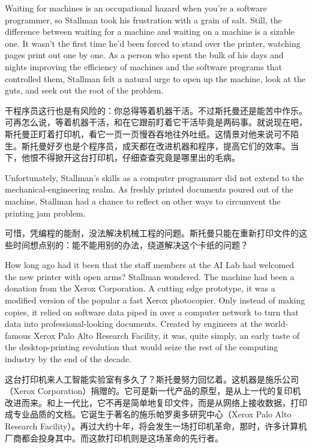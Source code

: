 \ifdefined\eng
Waiting for machines is an occupational hazard when you're a software programmer, so Stallman took his frustration with a grain of salt. Still, the difference between waiting for a machine and waiting on a machine is a sizable one. It wasn't the first time he'd been forced to stand over the printer, watching pages print out one by one. As a person who spent the bulk of his days and nights improving the efficiency of machines and the software programs that controlled them, Stallman felt a natural urge to open up the machine, look at the guts, and seek out the root of the problem.
\fi

\ifdefined\chs
干程序员这行也是有风险的：你总得等着机器干活。不过斯托曼还是能苦中作乐。可再怎么说，等着机器干活，和在它跟前盯着它干活毕竟是两码事。就说现在吧，斯托曼正盯着打印机，看它一页一页慢吞吞地往外吐纸。这情景对他来说可不陌生。斯托曼好歹也是个程序员，成天都在改进机器和程序，提高它们的效率。当下，他恨不得掀开这台打印机，仔细查查究竟是哪里出的毛病。
\fi

\ifdefined\eng
Unfortunately, Stallman's skills as a computer programmer did not extend to the mechanical-engineering realm. As freshly printed documents poured out of the machine, Stallman had a chance to reflect on other ways to circumvent the printing jam problem.
\fi

\ifdefined\chs
可惜，凭编程的能耐，没法解决机械工程的问题。斯托曼只能在重新打印文件的这些时间想点别的：能不能用别的办法，绕道解决这个卡纸的问题？
\fi

\ifdefined\eng
How long ago had it been that the staff members at the AI Lab had welcomed the new printer with open arms? Stallman wondered. The machine had been a donation from the Xerox Corporation. A cutting edge prototype, it was a modified version of 
\ifdefined\vone
the popular
\fi
\ifdefined\vtwo
a fast
\fi
Xerox photocopier. Only instead of making copies, it relied on software data piped in over a computer network to turn that data into professional-looking documents. Created by engineers at the world-famous Xerox Palo Alto Research Facility, it was, quite simply, an early taste of the desktop-printing revolution that would seize the rest of the computing industry by the end of the decade.
\fi

\ifdefined\chs
这台打印机来人工智能实验室有多久了？斯托曼努力回忆着。这机器是施乐公司（Xerox Corporation）捐赠的。它可是新一代产品的原型，是从上一代的复印机改进而来。和上一代比，它不再是简单地复印文件，而是从网络上接收数据，打印成专业品质的文档。它诞生于著名的施乐帕罗奥多研究中心（Xerox Palo Alto Research Facility）。再过大约十年，将会发生一场打印机革命，那时，许多计算机厂商都会投身其中。而这款打印机则是这场革命的先行者。
\fi

